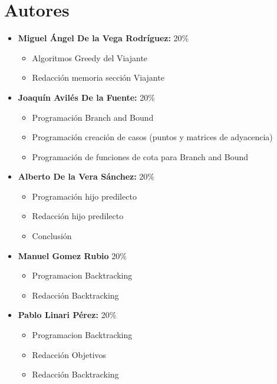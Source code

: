 \documentclass[11pt,openany]{book}
\begin{document}
\tableofcontents %
\newpage %


\chapter{Autores}
\begin{itemize}
      \item \textbf{Miguel Ángel De la Vega Rodríguez:} 20\%
            \begin{itemize}
                  \item Algoritmos Greedy del Viajante
                  \item Redacción memoria sección Viajante
            \end{itemize}
      \item \textbf{Joaquín Avilés De la Fuente:} 20\%
            \begin{itemize}
                  \item Programación Branch and Bound
                  \item Programación creación de casos (puntos y matrices de adyacencia)
                  \item Programación de funciones de cota para Branch and Bound
            \end{itemize}
      \item \textbf{Alberto De la Vera Sánchez: } 20\%
            \begin{itemize}
                  \item Programación hijo predilecto
                  \item Redacción hijo predilecto
                  \item Conclusión
            \end{itemize}
      \item \textbf{Manuel Gomez Rubio} 20\%
            \begin{itemize}
                \item Programacion Backtracking
                \item Redacción Backtracking
            \end{itemize}
      \item \textbf{Pablo Linari Pérez:} 20\%
            \begin{itemize}
                  \item Programacion Backtracking
                  \item Redacción Objetivos
                  \item Redacción Backtracking
            \end{itemize}
\end{itemize}
\end{document}
